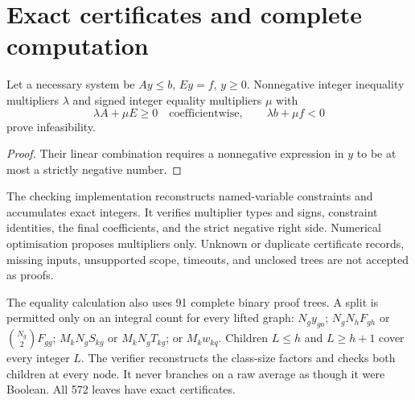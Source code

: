 \documentclass[11pt,a4paper]{article}
\begin{document}
\section{Exact certificates and complete computation}\label{sec:computation}
\begin{proposition}\label{prop:certificate}
Let a necessary system be $Ay\le b$, $Ey=f$, $y\ge0$. Nonnegative integer inequality multipliers $\lambda$ and signed integer equality multipliers $\mu$ with
\[
 \lambda A+\mu E\ge0\quad\text{coefficientwise},\qquad
 \lambda b+\mu f<0
\]
prove infeasibility.
\end{proposition}
\begin{proof}
Their linear combination requires a nonnegative expression in $y$ to be at most a strictly negative number.
\end{proof}
The checking implementation reconstructs named-variable constraints and accumulates exact integers. It verifies multiplier types and signs, constraint identities, the final coefficients, and the strict negative right side. Numerical optimisation proposes multipliers only. Unknown or duplicate certificate records, missing inputs, unsupported scope, timeouts, and unclosed trees are not accepted as proofs.

The equality calculation also uses 91 complete binary proof trees. A split is permitted only on an integral count for every lifted graph: $N_gy_{go}$; $N_gN_hF_{gh}$ or $\binom{N_g}{2}F_{gg}$; $M_kN_gS_{kg}$ or $M_kN_gT_{kg}$; or $M_kw_{kq}$. Children $L\le h$ and $L\ge h+1$ cover every integer $L$. The verifier reconstructs the class-size factors and checks both children at every node. It never branches on a raw average as though it were Boolean. All 572 leaves have exact certificates.
\end{document}
